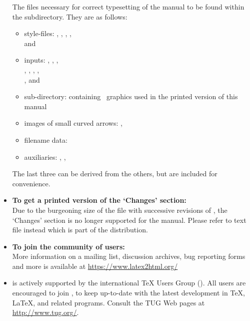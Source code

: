 \begin{itemize}
\medskip
{}\html{\\}%
\noindent
The files necessary for correct typesetting of the manual to be
found within the  subdirectory. 
They are as follows:
\begin{itemize}
%
%
%
\item
style-files:
 , , , ,\\
   and 
%
%
\item
inputs:
  , , ,\\
 , , , ,\\
 ,  and 
%
%
\item
sub-directory:
  containing \PS\ graphics
 used in the printed version of this manual
%
%
\item
images of small curved arrows: , 
%
%
\item
filename data:
%
%
\item
auxiliaries:
 , , 
%
\end{itemize}

The last three can be derived from the others, but are included for convenience.
\par

%
\item 

\textbf{To get a printed version of the `Changes' section: }\\
Due to the burgeoning size of the  file with successive
revisions of \latextohtml, the `Changes' section is no longer
supported for the manual.
Please refer to text file  instead which is part of the
distribution.


%
\item 
\textbf{To join the community of \latextohtml{} users:} \\
More information on a mailing list, discussion archives, bug reporting
forms and more is available at 
\url{https://www.latex2html.org/}


%
\item 
\latextohtml{} is actively supported by the international 
\TeX{} Users Group (\TUGurl). All users are encouraged to join \TUGurl,
to keep up-to-date with the latest development in \TeX{}, \LaTeX,
\latextohtml{} and related programs.
Consult the TUG Web pages at \url{http://www.tug.org/}.

\end{itemize}



